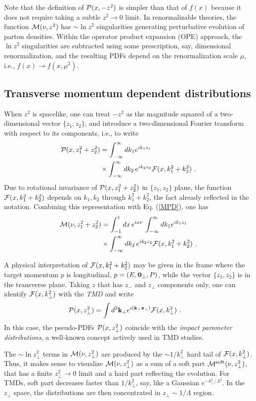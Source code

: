 Note that the definition of $ {\cal P} (x, -z^2) $ is simpler than that of $f(x)$ because it
does not require taking a subtle $z^2 \to 0$ limit.
In renormalizable theories,
the function $ {\cal M} (\nu, z^2)  $
has $\sim \ln z^2$ singularities
generating perturbative evolution of parton densities.
Within the operator product expansion
(OPE) approach, the $\ln z^2$ singularities
are subtracted using some prescription, say, dimensional renormalization,
and the resulting PDFs depend on the renormalization scale $\mu$, i.e.,
$f(x) \to   f(x, \mu^2)$.

\subsection{Transverse momentum dependent
distributions}

When $z^2$ is spacelike, one can treat $-z^2$
as the magnitude squared of a two-dimensional
vector $ \{z_1,z_2\}$, and introduce a two-dimensional
Fourier transform
with respect to its components, i.e., to write
\begin{align}
{\cal P} (x,  z_1^2+z_2^2)
&   =
\int_{-\infty}^\infty  {d k_1 } e^{i k_1 z_1}
\nonumber \\  & \times
\int_{-\infty}^\infty  dk_2 \,e^{ik_2z_2}
{\cal F} (x, k_1^2+k_2^2)
\   .
\label{PTMD}
\end{align}
Due to rotational invariance of ${\cal P} (x,  z_1^2+z_2^2) $
in $ \{z_1,z_2\}$ plane,
the function ${\cal F} (x, k_1^2+k_2^2)$ depends
on ${k_1,k_2}$ through $k_1^2+k_2^2$, the fact already reflected in the notation.
Combining this representation with Eq. (\ref{MPD}), one has
\begin{align}
{\cal M} (\nu,  z_1^2+z_2^2)
&   =  \int_{-1}^1 dx
\, e^{i x \nu  } \,
\int_{-\infty}^\infty  {d k_1 } e^{i k_1 z_1}
\nonumber \\  & \times
\int_{-\infty}^\infty  dk_2 \,e^{ik_2z_2}
{\cal F} (x, k_1^2+k_2^2)
\   .
\label{MTMD}
\end{align}

A physical interpretation of ${\cal F} (x, k_1^2+k_2^2)$
may be given in the frame where the target momentum $p$ is longitudinal,
\mbox{$p= (E, {\bf 0}_\perp, P)$,} while the vector
$\{z_1,z_2\} $ is in the transverse plane. Taking $z$ that has
$z_-$ and $z_\perp$ components only, one can identify ${\cal F} (x, k_\perp^2)$
with the
{\it TMD } and write
\begin{align}
{\cal P} (x,  z_\perp^2)
&   =
\int  d^2{\bf k}_\perp   e^{i ({\bf k}_\perp {\bf z}_\perp)}
{\cal F} (x, {k}_\perp^2)
\   .
\label{MTMD0}
\end{align}
In this case, the pseudo-PDFs $ {\cal P} (x,  z_\perp^2) $ coincide
with the {\it impact parameter distributions}, a well-known concept
actively
used in TMD studies.

The \mbox{$\sim \ln z_\perp^2$} terms
in ${\cal M} (\nu,  z_\perp^2) $ are
produced by the $\sim 1/k_\perp^2$ hard tail of ${\cal F} (x, k_\perp^2)$.
Thus, it makes sense to visualize
${\cal M} (\nu, z_\perp^2)  $ as a sum of a soft part ${\cal M}^{\rm soft} (\nu, z_\perp^2)$,
that has a finite $z_\perp^2\to 0$ limit
and a hard part reflecting the evolution.
For TMDs, soft part decreases faster than $1/k_\perp^2$, say, like
a Gaussian $e^{-k_\perp^2/\Lambda^2}$. In the $z_\perp$ space, the distributions
are then concentrated in \mbox{$z_\perp \sim 1/\Lambda$} region.
